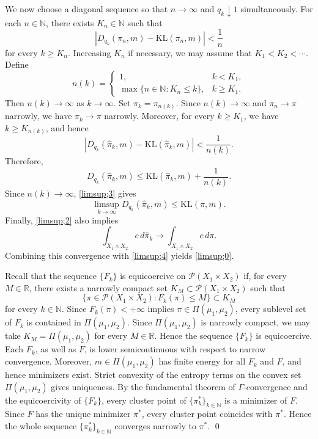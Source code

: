 \documentclass[a4paper,11pt]{article}
\theoremstyle{plain}
\theoremstyle{definition}
\theoremstyle{remark}
\theoremstyle{plain}
\newenvironment{pf}[1]
{{\noindent\textbf{Proof of #1.}}}{\hfill \qed}
\numberwithin{equation}{section}
\newcommand{\R}{\mathbb R}
\newcommand{\N}{\mathbb N}
\newcommand{\1}{\mbox{1}\hspace{-0.25em}\mbox{l}} %
\begin{document}
\begin{pf}{Theorem \ref{thm;narrow}}
We now choose a diagonal sequence so that $n\to\infty$ and $q_k\downarrow1$ simultaneously. For each $n\in\N$, there exists $K_n\in\N$ such that
\begin{equation*}
|D_{q_k}(\pi_n,m)-\mathrm{KL}(\pi_n,m)|<\frac{1}{n}
\end{equation*}
for every $k\geq K_n$. Increasing $K_n$ if necessary, we may assume that $K_1<K_2<\cdots$. Define
\begin{equation*}
n(k)=
\begin{cases}
1, & k<K_1,\\
\max\{n\in\N:K_n\leq k\}, & k\geq K_1.
\end{cases}
\end{equation*}
Then $n(k)\to\infty$ as $k\to\infty$. Set $\hat{\pi}_k=\pi_{n(k)}$. Since $n(k)\to\infty$ and $\pi_n\to\pi$ narrowly, we have $\hat{\pi}_k\to\pi$ narrowly. Moreover, for every $k\geq K_1$, we have $k\geq K_{n(k)}$, and hence
\begin{equation*}
|D_{q_k}(\hat{\pi}_k,m)-\mathrm{KL}(\hat{\pi}_k,m)|<\frac{1}{n(k)}.
\end{equation*}
Therefore,
\begin{equation*}
D_{q_k}(\hat{\pi}_k,m)\leq\mathrm{KL}(\hat{\pi}_k,m)+\frac{1}{n(k)}.
\end{equation*}
Since $n(k)\to\infty$, \eqref{limsup;3} gives
\begin{equation}\label{limsup;4}
\limsup_{k\to\infty}D_{q_k}(\hat{\pi}_k,m)\leq\mathrm{KL}(\pi,m).
\end{equation}
Finally, \eqref{limsup;2} also implies
\begin{equation*}
\int_{X_1\times X_2}c\,d\hat{\pi}_k\to\int_{X_1\times X_2}c\,d\pi.
\end{equation*}
Combining this convergence with \eqref{limsup;4} yields \eqref{limsup;0}.

Recall that the sequence $\{F_k\}$ is equicoercive on $\mathcal{P}(X_1\times X_2)$ if, for every $M\in\R$, there exists a narrowly compact set $K_M\subset\mathcal{P}(X_1\times X_2)$ such that
\begin{equation*}
\{\pi\in\mathcal{P}(X_1\times X_2):F_k(\pi)\leq M\}\subset K_M
\end{equation*}
for every $k\in\N$. Since $F_k(\pi)<+\infty$ implies $\pi\in\Pi(\mu_1,\mu_2)$, every sublevel set of $F_k$ is contained in $\Pi(\mu_1,\mu_2)$. Since $\Pi(\mu_1,\mu_2)$ is narrowly compact, we may take $K_M=\Pi(\mu_1,\mu_2)$ for every $M\in\R$. Hence the sequence $\{F_k\}$ is equicoercive. Each $F_k$, as well as $F$, is lower semicontinuous with respect to narrow convergence. Moreover, $m\in\Pi(\mu_1,\mu_2)$ has finite energy for all $F_k$ and $F$, and hence minimizers exist. Strict convexity of the entropy terms on the convex set $\Pi(\mu_1,\mu_2)$ gives uniqueness. By the fundamental theorem of $\Gamma$-convergence and the equicoercivity of $\{F_k\}$, every cluster point of $\{\pi_k^*\}_{k\in\N}$ is a minimizer of $F$. Since $F$ has the unique minimizer $\pi^*$, every cluster point coincides with $\pi^*$. Hence the whole sequence $\{\pi_k^*\}_{k\in\N}$ converges narrowly to $\pi^*$.
\end{pf}
\end{document}
